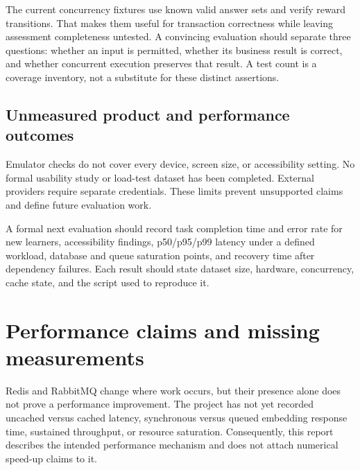 \documentclass[12pt,a4paper,oneside]{report}
\begin{document}
The current concurrency fixtures use known valid answer sets and verify reward
transitions. That makes them useful for transaction correctness while leaving
assessment completeness untested. A convincing evaluation should separate three
questions: whether an input is permitted, whether its business result is correct,
and whether concurrent execution preserves that result. A test count is a coverage
inventory, not a substitute for these distinct assertions.

\subsection{Unmeasured product and performance outcomes}
Emulator checks do not cover every device, screen size, or accessibility setting.
No formal usability study or load-test dataset has been completed. External providers
require separate credentials. These limits prevent unsupported claims and define
future evaluation work.

A formal next evaluation should record task completion time and error rate for new
learners, accessibility findings, p50/p95/p99 latency under a defined workload,
database and queue saturation points, and recovery time after dependency failures.
Each result should state dataset size, hardware, concurrency, cache state, and the
script used to reproduce it.

\section{Performance claims and missing measurements}
Redis and RabbitMQ change where work occurs, but their presence alone does not prove a
performance improvement. The project has not yet recorded uncached versus cached
latency, synchronous versus queued embedding response time, sustained throughput, or
resource saturation. Consequently, this report describes the intended performance
mechanism and does not attach numerical speed-up claims to it.
\end{document}
